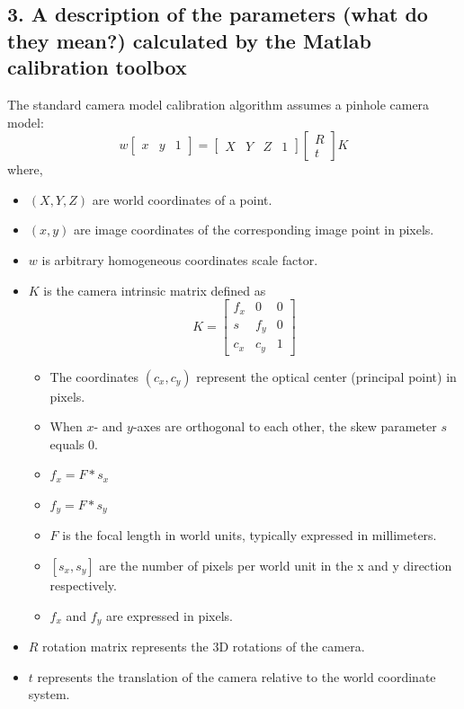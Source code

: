 \subsection*{3. A description of the parameters (what do they mean?) calculated by the Matlab calibration toolbox}
The standard camera model calibration algorithm assumes a pinhole camera model:
\begin{equation}
w \begin{bmatrix} x & y & 1 \end{bmatrix} = \begin{bmatrix} X & Y & Z & 1 \end{bmatrix} \begin{bmatrix} R \\ t \end{bmatrix} K
\end{equation}
where,
\begin{itemize}
\item $(X,Y,Z)$ are world coordinates of a point.
\item $(x,y)$ are image coordinates of the corresponding image point in pixels.
\item $w$ is arbitrary homogeneous coordinates scale factor.
\item $K$ is the camera intrinsic matrix defined as
\begin{equation}
K = \begin{bmatrix}
f_x & 0 & 0 \\
s & f_y & 0 \\
c_x & c_y & 1
\end{bmatrix}
\end{equation} 
\begin{itemize}
\item The coordinates $(c_x, c_y)$ represent the optical center (principal point) in pixels.
\item When $x$- and $y$-axes are orthogonal to each other, the skew parameter $s$ equals $0$.
\item $f_x = F*s_x$
\item $f_y = F*s_y$
\item $F$ is the focal length in world units, typically expressed in millimeters.
\item $[s_x, s_y]$  are the number of pixels per world unit in the x and y direction respectively.
\item $f_x$ and $f_y$ are expressed in pixels.
\end{itemize}
\item $R$ rotation matrix represents the 3D rotations of the camera.
\item $t$ represents the translation of the camera relative to the world coordinate system.
\end{itemize}

